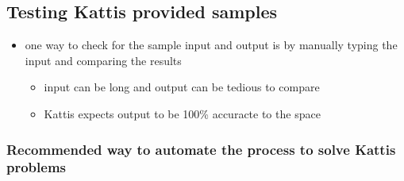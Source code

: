 \documentclass[11pt]{article}
\providecommand{\tightlist}{%
      \setlength{\itemsep}{0pt}\setlength{\parskip}{0pt}}
\begin{document}
    \hypertarget{testing-kattis-provided-samples}{%
\subsection{Testing Kattis provided
samples}\label{testing-kattis-provided-samples}}

\begin{itemize}
\tightlist
\item
  one way to check for the sample input and output is by manually typing
  the input and comparing the results

  \begin{itemize}
  \tightlist
  \item
    input can be long and output can be tedious to compare
  \item
    Kattis expects output to be 100\% accuracte to the space
  \end{itemize}
\end{itemize}

\hypertarget{recommended-way-to-automate-the-process-to-solve-kattis-problems}{%
\subsubsection{Recommended way to automate the process to solve Kattis
problems}\label{recommended-way-to-automate-the-process-to-solve-kattis-problems}}
\end{document}
